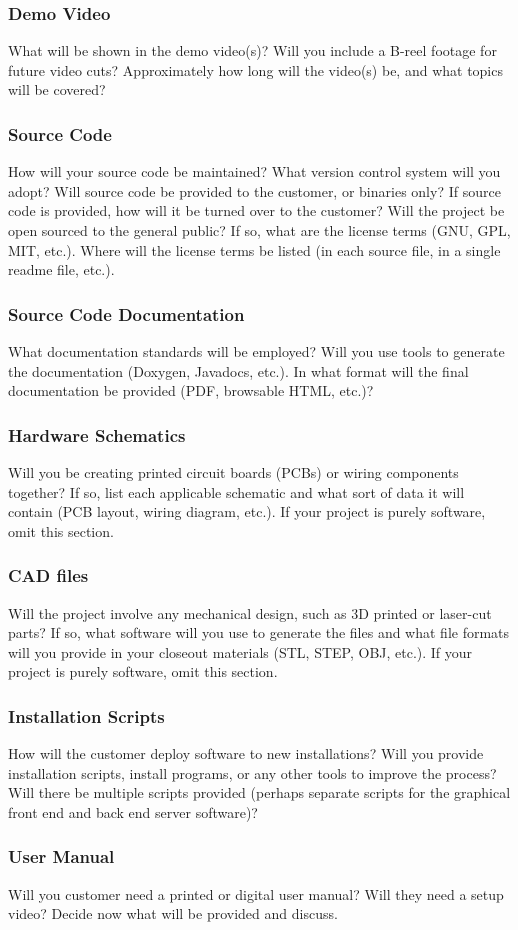 \subsubsection{Demo Video}
What will be shown in the demo video(s)? Will you include a B-reel footage for future video cuts? Approximately how long will the video(s) be, and what topics will be covered?

\subsubsection{Source Code}
How will your source code be maintained? What version control system will you adopt? Will source code be provided to the customer, or binaries only? If source code is provided, how will it be turned over to the customer? Will the project be open sourced to the general public? If so, what are the license terms (GNU, GPL, MIT, etc.). Where will the license terms be listed (in each source file, in a single readme file, etc.).

\subsubsection{Source Code Documentation}
What documentation standards will be employed? Will you use tools to generate the documentation (Doxygen, Javadocs, etc.). In what format will the final documentation be provided (PDF, browsable HTML, etc.)?

\subsubsection{Hardware Schematics}
Will you be creating printed circuit boards (PCBs) or wiring components together? If so, list each applicable schematic and what sort of data it will contain (PCB layout, wiring diagram, etc.). If your project is purely software, omit this section.

\subsubsection{CAD files}
Will the project involve any mechanical design, such as 3D printed or laser-cut parts? If so, what software will you use to generate the files and what file formats will you provide in your closeout materials (STL, STEP, OBJ, etc.). If your project is purely software, omit this section.

\subsubsection{Installation Scripts}
How will the customer deploy software to new installations? Will you provide installation scripts, install programs, or any other tools to improve the process? Will there be multiple scripts provided (perhaps separate scripts for the graphical front end and back end server software)? 

\subsubsection{User Manual}
Will you customer need a printed or digital user manual? Will they need a setup video? Decide now what will be provided and discuss.
